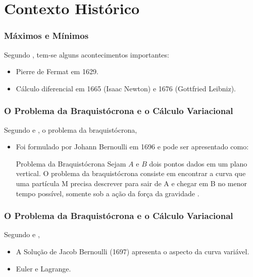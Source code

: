 \documentclass{beamer}
\newif\ifcompilepause
\newcommand{\cpause}{
	\ifcompilepause
	\pause
	\fi
}
\begin{document}
	\section{Contexto Histórico}

	\begin{frame}
		\frametitle{Máximos e Mínimos}
		\justify
	
		Segundo , tem-se alguns acontecimentos importantes:
		\begin{itemize}
			\justifying
		    \item Pierre de Fermat em 1629.
		    \cpause
		    \item Cálculo diferencial em 1665 (Isaac Newton) e 1676 (Gottfried Leibniz).
		\end{itemize}
	\end{frame}

	\begin{frame}
		\frametitle{O Problema da Braquistócrona e o Cálculo Variacional}
		\justify
	
		Segundo  e , o problema da braquistócrona,
		\begin{itemize}
			\item Foi formulado por Johann Bernoulli em 1696 e pode ser apresentado como:
			\begin{block}{Problema da Braquistócrona}
				Sejam $A$ e $B$ dois pontos dados em um plano vertical. O problema da braquistócrona consiste em encontrar a curva que uma partícula M precisa descrever para sair de A e chegar em B no menor tempo possível, somente sob a ação da força da gravidade \cite[p. 3]{calcvar}.
			\end{block}
		\end{itemize}
	\end{frame}

	\begin{frame}
		\frametitle{O Problema da Braquistócrona e o Cálculo Variacional}
		\justify

		Segundo  e \citeonline{hist_still},
		\begin{itemize}
			\item A Solução de Jacob Bernoulli (1697) apresenta o aspecto da curva variável.
			\cpause
		
			\item Euler e Lagrange.
		\end{itemize}
	\end{frame}
	
\end{document}
